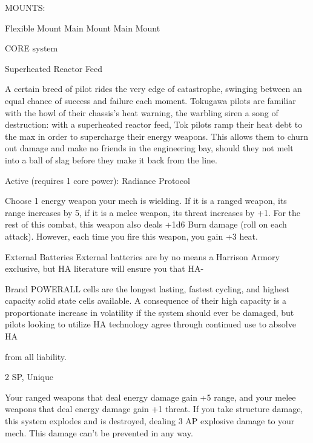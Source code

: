                                                        MOUNTS: 

  Flexible Mount                       Main Mount                               Main Mount 

                                                    CORE system 

                                             Superheated Reactor Feed  

  A certain breed of pilot rides the very edge of catastrophe, swinging between an equal chance of  
  success and failure each moment. Tokugawa pilots are familiar with the howl of their chassis’s heat  
  warning, the warbling siren a song of destruction: with a superheated reactor feed, Tok pilots ramp their  
  heat debt to the max in order to supercharge their energy weapons. This allows them to churn out  
  damage and make no friends in the engineering bay, should they not melt into a ball of slag before they  
  make it back from the line.   

  Active (requires 1 core power):   
  Radiance  
  Protocol
 
  Choose 1 energy weapon your mech is wielding. If it is a ranged weapon, its range increases by 5, if it  
  is a melee weapon, its threat increases by +1. For the rest of this combat, this weapon also deals +1d6  
  Burn damage (roll on each attack). However, each time you fire this weapon, you gain +3 heat. 

External Batteries  
External batteries are by no means a Harrison Armory exclusive, but HA literature will ensure you that HA- 

Brand POWERALL cells are the longest lasting, fastest cycling, and highest capacity solid state cells  
available. A consequence of their high capacity is a proportionate increase in volatility if the system should  
ever be damaged, but pilots looking to utilize HA technology agree through continued use to absolve HA  

from all liability.   

2 SP, Unique
 

                                                                                                                     


Your ranged weapons that deal energy damage gain +5 range, and your melee weapons that  
deal energy damage gain +1 threat. If you take structure damage, this system explodes and is  
destroyed, dealing 3 AP explosive damage to your mech. This damage can’t be prevented in any  
way.
 

